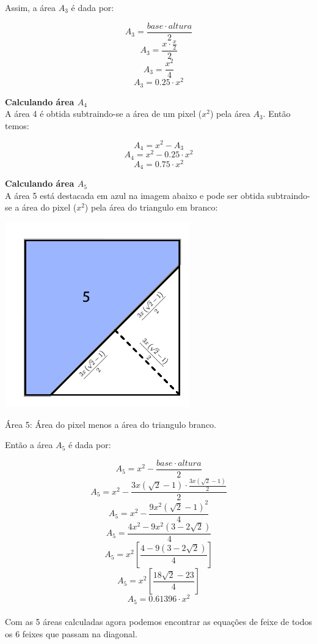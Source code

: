 \documentclass[a4paper, 12pt]{article}
\begin{document}
Assim, a área $A_3$ é dada por:

$$A_3=\frac{base\cdot altura}{2}$$
$$A_3=\frac{x\cdot \frac{x}{2}}{2}$$
$$A_3=\frac{x^2}{4}$$
$$\boxed{\ \ A_3=0.25\cdot x^2\ \ }$$

\textbf{Calculando área $A_4$}\\

A área 4 é obtida subtraindo-se a área de um pixel ($x^2$) pela área $A_3$. Então temos:

$$A_4=x^2-A_3$$
$$A_4=x^2-0.25\cdot x^2$$
$$\boxed{\ \ A_4=0.75\cdot x^2\ \ }$$

\textbf{Calculando área $A_5$}\\

A área 5 está destacada em azul na imagem abaixo e pode ser obtida subtraindo-se a área do pixel ($x^2$) pela área do triangulo em branco:

\begin{center}
    \includegraphics[width=8cm]{08_area_5.fw.png}
    
    Área 5: Área do pixel menos a área do triangulo branco.
\end{center}

Então a área $A_5$ é dada por:

$$A_5=x^2-\frac{base\cdot altura}{2}$$
$$A_5=x^2-\frac{3x\left(\sqrt{2}-1\right)\cdot \frac{3x\left(\sqrt{2}-1\right)}{2}}{2}$$
$$A_5=x^2-\frac{9x^2\left(\sqrt{2}-1\right)^2}{4}$$
$$A_5=\frac{4x^2-9x^2\left(3-2\sqrt{2}\right)}{4}$$
$$A_5=x^2\left[\frac{4-9\left(3-2\sqrt{2}\right)}{4}\right]$$
$$A_5=x^2\left[\frac{18\sqrt{2}-23}{4}\right]$$
$$\boxed{\ \ A_5=0.61396\cdot x^2\ \ }$$\\

Com as 5 áreas calculadas agora podemos encontrar as equações de feixe de todos os 6 feixes que passam na diagonal.
\end{document}
